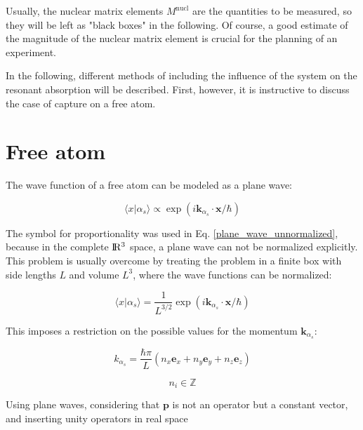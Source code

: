 \documentclass{article}
\begin{document}
Usually, the nuclear matrix elements $M^{\mathrm{nucl}}$ are the quantities to be measured, so they will be left as "black boxes" in the following. 
Of course, a good estimate of the magnitude of the nuclear matrix element is crucial for the planning of an experiment.

In the following, different methods of including the influence of the system on the resonant absorption will be described. First, however, it is instructive to discuss the case of capture on a free atom.

\section{Free atom}
The wave function of a free atom can be modeled as a plane wave:

\begin{equation}
\label{plane_wave_unnormalized}
	\langle x | \alpha_s \rangle \propto \exp{ \left( i \mathbf{k}_{\alpha_s} \cdot \mathbf{x} / \hbar \right) }
\end{equation}

The symbol for proportionality was used in Eq. \ref{plane_wave_unnormalized}, because in the complete $\rm I\!R^3$ space, a plane wave can not be normalized explicitly. 
This problem is usually overcome by treating the problem in a finite box with side lengths $L$ and volume $L^3$, where the wave functions can be normalized:

\begin{equation}
\label{plane_wave_normalized}
	\langle x | \alpha_s \rangle = \frac{1}{L^{ 3/2}} \exp{ \left( i \mathbf{k}_{\alpha_s} \cdot \mathbf{x} / \hbar \right) }
\end{equation}

This imposes a restriction on the possible values for the momentum $\mathbf{k}_{\alpha_s}$:

\begin{equation}
	\label{k_quantization}
	k_{\alpha_s} = \frac{\hbar \pi}{L} \left( n_x \mathbf{e}_x + n_y \mathbf{e}_y + n_z \mathbf{e}_z \right)
\end{equation}

\begin{equation*}
	n_i \in \mathbb{Z}
\end{equation*}

Using plane waves, considering that $\mathbf{p}$ is not an operator but a constant vector, and inserting unity operators in real space
\end{document}
